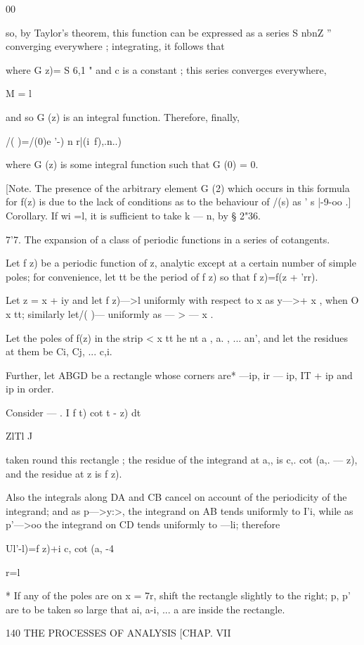 {00

so, by Taylor's theorem, this function can be expressed as a series S
nbnZ ''~ converging everywhere ; integrating, it follows that

where G z)= S 6,1 " and c is a constant ; this series converges
everywhere,

M = l

and so G (z) is an integral function. Therefore, finally,

/( )=/(0)e '-) n r|(i\ f),.n..)

where G (z) is some integral function such that G (0) = 0.

[Note. The presence of the arbitrary element G (2) which occurs in
this formula for f(z) is due to the lack of conditions as to the
behaviour of /(s) as ' s |-9-oo .] Corollary. If wi =l, it is
sufficient to take k — n, by § 2"36.

7'7. The expansion of a class of periodic functions in a series of
cotangents.

Let f z) be a periodic function of z, analytic except at a certain
number of simple poles; for convenience, let tt be the period of f z)
so that f z)=f(z + 'rr).

Let z = x + iy and let f z)—>l uniformly with respect to x as y—>+ x ,
when O x tt; similarly let/( )— uniformly as — > — x .

Let the poles of f(z) in the strip < x tt he nt a , a. , ... an', and
let the residues at them be Ci, Cj, ... c,i.

Further, let ABGD be a rectangle whose corners are* —ip, ir — ip, IT +
ip and ip in order.

Consider — . I f t) cot t - z) dt

ZlTl J

taken round this rectangle ; the residue of the integrand at a,, is
c,. cot (a,. — z), and the residue at z is f z).

Also the integrals along DA and CB cancel on account of the
periodicity of the integrand; and as p—>y:>, the integrand on AB tends
uniformly to I'i, while as p'—>oo the integrand on CD tends uniformly
to —li; therefore

Ul'-l)=f z)+i c, cot (a, -4

r=l

* If any of the poles are on x = 7r, shift the rectangle slightly to
the right; p, p' are to be taken so large that ai, a-i, ... a are
inside the rectangle.

140 THE PROCESSES OF ANALYSIS [CHAP. VII

}
